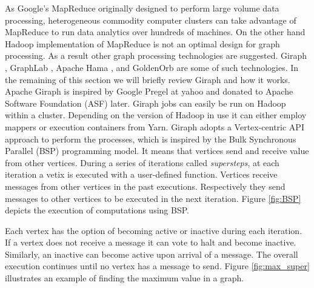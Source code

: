 \documentclass[runningheads,a4paper]{llncs}
\begin{document}
{As Google's MapReduce originally designed to perform large volume data processing, heterogeneous commodity computer clusters can take advantage of MapReduce to run data analytics over hundreds of machines. On the other hand Hadoop implementation of MapReduce is not an optimal design for graph processing. As a result other graph processing technologies are suggested. Giraph \cite{avery2011giraph}, GraphLab \cite{low2014graphlab}, Apache Hama \cite{seo2010hama}, and GoldenOrb  are some of such technologies. In the remaining of this section we will briefly review Giraph and how it works.\\

Apache Giraph is inspired by Google Pregel \cite{malewicz2010pregel} at yahoo and donated to Apache Software Foundation (ASF) later. Giraph jobs can easily be run on Hadoop within a cluster. Depending on the version of Hadoop in use it can either employ mappers or execution containers from Yarn. Giraph adopts a Vertex-centric API approach to perform the processes, which is inspired by the Bulk Synchronous Parallel (BSP) programming model. It means that vertices send and receive value from other vertices. During a series of iterations called \textit{supersteps}, at each iteration a vetix is executed with a user-defined function. Vertices receive messages from other vertices in the past executions. Respectively they send messages to other vertices to be executed in the next iteration. Figure \ref{fig:BSP} depicts the execution of computations using BSP.

Each vertex has the option of becoming active or inactive during each iteration. If a vertex does not receive a message it can vote to halt and become inactive. Similarly, an inactive can become active upon arrival of a message. The overall execution continues until no vertex has a message to send. Figure \ref{fig:max_super} illustrates an example of finding the maximum value in a graph.

}
\end{document}
